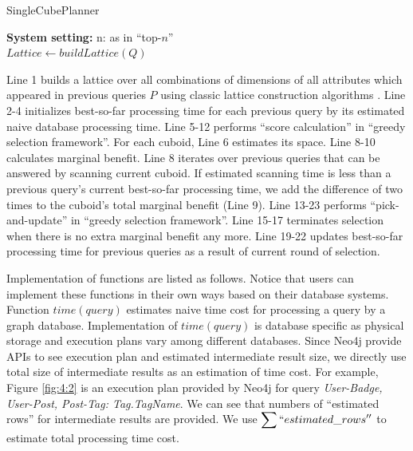 \begin{algorithm}[H]
	\caption{SingleCubePlanner}
	\LinesNumbered 
	\textbf{System setting:} n: as in ``top-$n$''\\ 
	$Lattice \leftarrow buildLattice(Q)$\;
	
\end{algorithm}
\clearpage

Line 1 builds a lattice over all combinations of dimensions of all attributes which appeared in previous queries $P$ using classic lattice construction algorithms \cite{DBLP:journals/ipl/NourineR99}. Line 2-4 initializes best-so-far processing time for each previous query by its estimated naive database processing time. Line 5-12 performs ``score calculation'' in ``greedy selection framework''. For each cuboid, Line 6 estimates its space. Line 8-10 calculates marginal benefit. Line 8 iterates over previous queries that can be answered by scanning current cuboid. If estimated scanning time is less than a previous query's current best-so-far processing time, we add the difference of two times to the cuboid's total marginal benefit (Line 9). Line 13-23 performs ``pick-and-update'' in ``greedy selection framework''. Line 15-17 terminates selection when there is no extra marginal benefit any more. Line 19-22 updates best-so-far processing time for previous queries as a result of current round of selection.

Implementation of functions are listed as follows. Notice that users can implement these functions in their own ways based on their database systems. Function \textbf{$time(query)$} estimates naive time cost for processing a query by a graph database. Implementation of $time(query)$ is database specific as physical storage and execution plans vary among different databases. Since Neo4j provide APIs to see execution plan and estimated intermediate result size, we directly use total size of intermediate results as an estimation of time cost. For example, Figure \ref{fig:4:2} is an execution plan provided by Neo4j for query \textit{User-Badge, User-Post, Post-Tag: Tag.TagName}. We can see that numbers of ``estimated rows'' for intermediate results are provided. We use  $\displaystyle{\sum ``estimated\_rows''}$ to estimate total processing time cost.

